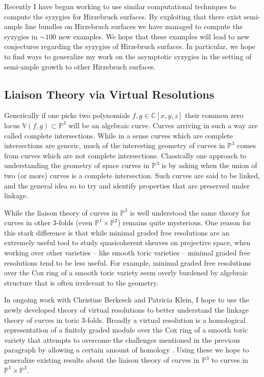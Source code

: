 \documentclass[10pt,reqno]{amsart}
\theoremstyle{remark}
\newcommand{\C}{\mathbb{C}}
\renewcommand{\P}{\mathbb{P}}
\newcommand{\V}{\mathbb{V}}
\begin{document}
Recently I have begun working to use similar computational techniques to compute the syzygies for Hirzebruch surfaces. By exploiting that there exist semi-ample line bundles on Hirzebruch surfaces we have managed to compute the syzygies in  $\sim100$ new examples. We hope that these examples will lead to new conjectures regarding the syzygies of Hirzebruch surfaces. In particular, we hope to find ways to generalize my work on the asymptotic syzygies in the setting of semi-ample growth to other Hirzebruch surfaces. 

\subsection{Liaison Theory via Virtual Resolutions}

Generically if one picks two polynomials $f,g\in \C[x,y,z]$ their common zero locus $\V(f,g)\subset \P^3$ will be an algebraic curve. Curves arriving in such a way are called complete intersections. While in a sense curves which are complete intersections are generic, much of the interesting geometry of curves in $\P^3$ comes from curves which are not complete intersections. Classically one approach to understanding the geometry of space curves in $\P^3$ is by asking when the union of two (or more) curves is a complete intersection. Such curves are said to be linked, and the general idea so to try and identify properties that are preserved under linkage. 

While the liaison theory of curves in $\P^3$ is well understood the same theory for curves in other 3-folds (even $\P^1\times\P^2$) remains quite mysterious. One reason for this stark difference is that while minimal graded free resolutions are an extremely useful tool to study quasicoherent sheaves on projective space, when working over other varieties -- like smooth toric varieties --  minimal graded free resolutions tend to be less useful. For example, minimal graded free resolutions over the Cox ring of a smooth toric variety seem overly burdened by algebraic structure that is often irrelevant to the geometry. 

In ongoing work with Christine Berkesch and Patricia Klein, I hope to use the newly developed theory of virtual resolutions to better understand the linkage theory of curves in toric 3-folds. Broadly a virtual resolution is a homological representation of a finitely graded module over the Cox ring of a smooth toric variety that attempts to overcome the challenges mentioned in the previous paragraph by allowing a certain amount of homology \cite{berkeschErmanSmith17}. Using these we hope to generalize existing results about the liaison theory of  curves in $\P^3$ to curves in $\P^1\times\P^2$. 
\end{document}
